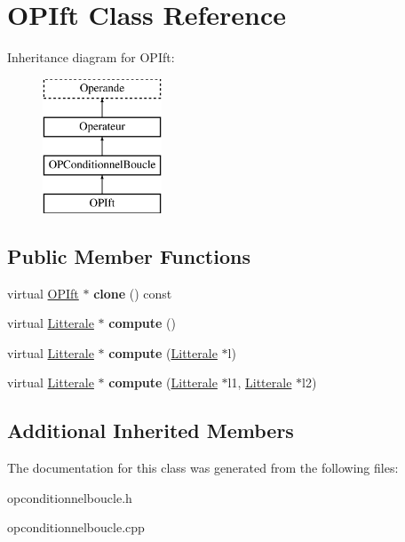\hypertarget{class_o_p_ift}{}\section{O\+P\+Ift Class Reference}
\label{class_o_p_ift}
Inheritance diagram for O\+P\+Ift\+:\begin{figure}[H]
\begin{center}
\leavevmode
\includegraphics[height=4.000000cm]{class_o_p_ift}
\end{center}
\end{figure}
\subsection*{Public Member Functions}
\begin{DoxyCompactItemize}
\item 
virtual \hyperlink{class_o_p_ift}{O\+P\+Ift} $\ast$ {\bfseries clone} () const \hypertarget{class_o_p_ift_ae2fba0f2289ed0735850effe351d51c9}{}\label{class_o_p_ift_ae2fba0f2289ed0735850effe351d51c9}

\item 
virtual \hyperlink{class_litterale}{Litterale} $\ast$ {\bfseries compute} ()\hypertarget{class_o_p_ift_a5bd05c18e9e0786de86e1658f9835111}{}\label{class_o_p_ift_a5bd05c18e9e0786de86e1658f9835111}

\item 
virtual \hyperlink{class_litterale}{Litterale} $\ast$ {\bfseries compute} (\hyperlink{class_litterale}{Litterale} $\ast$l)\hypertarget{class_o_p_ift_a9693ee3b37a2fcf6ea34097cdd4634eb}{}\label{class_o_p_ift_a9693ee3b37a2fcf6ea34097cdd4634eb}

\item 
virtual \hyperlink{class_litterale}{Litterale} $\ast$ {\bfseries compute} (\hyperlink{class_litterale}{Litterale} $\ast$l1, \hyperlink{class_litterale}{Litterale} $\ast$l2)\hypertarget{class_o_p_ift_a1bfd149f76aa1f87b47d320fc16f12bb}{}\label{class_o_p_ift_a1bfd149f76aa1f87b47d320fc16f12bb}

\end{DoxyCompactItemize}
\subsection*{Additional Inherited Members}


The documentation for this class was generated from the following files\+:\begin{DoxyCompactItemize}
\item 
opconditionnelboucle.\+h\item 
opconditionnelboucle.\+cpp\end{DoxyCompactItemize}
